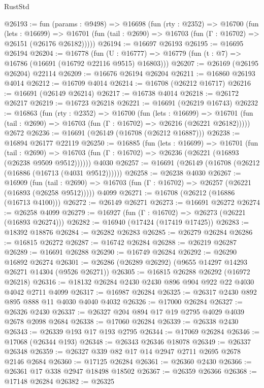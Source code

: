 \begin{lexlean}{RustStd}
\begin{coremodule}
@26193 := fun (params : @9498) =>
  @16698
    (fun (rty : @2352) =>
    @16700
      (fun (lets : @16699) =>
      @16701 (fun (tail : @2690) => @16703 (fun (Γ : @16702) => @26151 (@26176 @26182)))))
@26194 := @16697 @26193
@26195 := @16695 @26194
@26204 := @16778
    (fun (U : @16777) => @16779 (fun (t : @7) => @16786 (@16691 (@16792 @22116 @9515) @16803)))
@26207 := @26169 (@26195 @26204) @22114
@26209 := @16676 @26194 @26204
@26211 := @16860 @26193 @4014
@26212 := @16709 @4014
@26214 := @16708 (@26212 @16717)
@26216 := @16691 (@26149 @26214)
@26217 := @16738 @4014
@26218 := @26172 @26217
@26219 := @16723 @26218
@26221 := @16691 (@26219 @16743)
@26232 := @16863
    (fun (rty : @2352) =>
    @16700
      (fun (lets : @16699) =>
      @16701 (fun (tail : @2690) => @16703 (fun (Γ : @16702) => @26216 (@26221 @26182)))))
    @2672
@26236 := @16691 (@26149 (@16708 (@26212 @16887)))
@26238 := @16894 @26177 @22119
@26250 := @16885
    (fun (lets : @16699) =>
    @16701
      (fun (tail : @2690) =>
      @16703 (fun (Γ : @16702) => @26236 (@26221 (@16893 (@26238 @9509 @9512))))))
    @4030
@26257 := @16691 (@26149 (@16708 (@26212 (@16886 (@16713 (@4031 @9512))))))
@26258 := @26238 @4030
@26267 := @16909
    (fun (tail : @2690) => @16703 (fun (Γ : @16702) => @26257 (@26221 (@16893 (@26258 @9512)))))
    @4099
@26271 := @16708 (@26212 (@16886 (@16713 @4100)))
@26272 := @26149 @26271
@26273 := @16691 @26272
@26274 := @26258 @4099
@26279 := @16927 (fun (Γ : @16702) => @26273 (@26221 (@16893 @26274)))
@26282 := @16940 (@17424 (@17419 @17425))
@26283 := @18392 @18876
@26284 := @26282 @26283
@26285 := @26279 @26284
@26286 := @16815 @26272
@26287 := @16742 @26284
@26288 := @26219 @26287
@26289 := @16691 @26288
@26290 := @16749 @26284
@26292 := @26290 @16892 @26274
@26301 := @26286 (@26289 @26292) (@9655 @14297 @14293 @26271 @14304 (@9526 @26271))
@26305 := @16815 @26288 @26292 (@16972 @26218)
@26316 := @18132 @26284 @2430 @2430 @896 @904 @922 @22 @4030 @4042 @2711 @4099
@26317 := @16987 @26284
@26325 := @26317 @2430 @892 @895 @888 @11 @4030 @4040 @4032
@26326 := @17000 @26284
@26327 := @26326 @2430
@26337 := @26327 @204 @894 @17 @19 @2795 @4029 @4039 @2678 @2098 @2684
@26338 := @17060 @26284
@26339 := @26338 @2430
@26343 := @26339 @193 @17 @193 @2795
@26344 := @17069 @26284
@26346 := @17068 (@26344 @193)
@26348 := @26343 @26346 @18078
@26349 := @26337 @26348
@26359 := @26327 @339 @82 @17 @14 @2947 @2711 @2695 @2678 @2146 @2684
@26360 := @17125 @26284
@26361 := @26360 @2430
@26366 := @26361 @17 @338 @2947 @18498 @18502
@26367 := @26359 @26366
@26368 := @17148 @26284
@26382 := @26325

\end{coremodule}
\end{lexlean}
